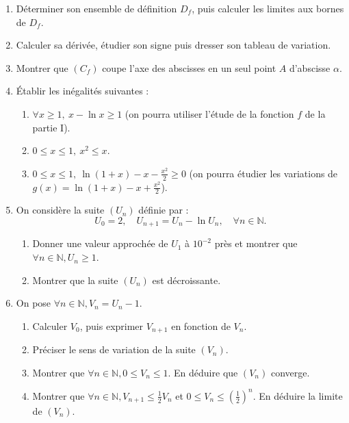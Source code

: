 \documentclass[a4paper,11pt]{article}
\begin{document}
\begin{enumerate}
    \item Déterminer son ensemble de définition \(D_f\), puis calculer les limites aux bornes de \(D_f\).
    \item Calculer sa dérivée, étudier son signe puis dresser son tableau de variation.
    \item Montrer que \((C_f)\) coupe l’axe des abscisses en un seul point \(A\) d’abscisse \(\alpha\).
    \item Établir les inégalités suivantes :
    \begin{enumerate}
        \item \(\forall x \geq 1, \ x - \ln x \geq 1\) (on pourra utiliser l’étude de la fonction \(f\) de la partie I).
        \item \(0 \leq x \leq 1, \ x^2 \leq x\).
        \item \(0 \leq x \leq 1, \ \ln(1 + x) - x - \frac{x^2}{2} \geq 0\) (on pourra étudier les variations de \(g(x) = \ln(1 + x) - x + \frac{x^2}{2}\)).
    \end{enumerate}

    \item On considère la suite \((U_n)\) définie par :
    \[
    U_0 = 2, \quad U_{n+1} = U_n - \ln U_n, \quad \forall n \in \mathbb{N}.
    \]
    \begin{enumerate}
        \item Donner une valeur approchée de \(U_1\) à \(10^{-2}\) près et montrer que \(\forall n \in \mathbb{N}, U_n \geq 1\).
        \item Montrer que la suite \((U_n)\) est décroissante.
    \end{enumerate}

    \item On pose \(\forall n \in \mathbb{N}, V_n = U_n - 1\).
    \begin{enumerate}
        \item Calculer \(V_0\), puis exprimer \(V_{n+1}\) en fonction de \(V_n\).
        \item Préciser le sens de variation de la suite \((V_n)\).
        \item Montrer que \(\forall n \in \mathbb{N}, 0 \leq V_n \leq 1\). En déduire que \((V_n)\) converge.
        \item Montrer que \(\forall n \in \mathbb{N}, V_{n+1} \leq \frac{1}{2} V_n\) et \(0 \leq V_n \leq \left(\frac{1}{2}\right)^n\). En déduire la limite de \((V_n)\).
    \end{enumerate}
\end{enumerate}
\end{document}
